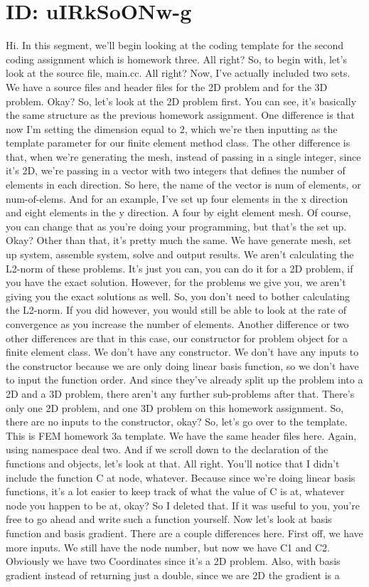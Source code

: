 \documentclass[10pt]{article}
\begin{document}
\section*{ID: uIRkSoONw-g}
Hi. In this segment, we'll begin looking at the coding template for the second coding assignment which is homework three. All right? So, to begin with, let's look at the source file, main.cc. All right? Now, I've actually included two sets. We have a source files and header files for the 2D problem and for the 3D problem. Okay? So, let's look at the 2D problem first. You can see, it's basically the same structure as the previous homework assignment. One difference is that now I'm setting the dimension equal to 2, which we're then inputting as the template parameter for our finite element method class. The other difference is that, when we're generating the mesh, instead of passing in a single integer, since it's 2D, we're passing in a vector with two integers that defines the number of elements in each direction. So here, the name of the vector is num of elements, or num-of-elems. And for an example, I've set up four elements in the x direction and eight elements in the y direction. A four by eight element mesh. Of course, you can change that as you're doing your programming, but that's the set up. Okay? Other than that, it's pretty much the same. We have generate mesh, set up system, assemble system, solve and output results. We aren't calculating the L2-norm of these problems. It's just you can, you can do it for a 2D problem, if you have the exact solution. However, for the problems we give you, we aren't giving you the exact solutions as well. So, you don't need to bother calculating the L2-norm. If you did however, you would still be able to look at the rate of convergence as you increase the number of elements. Another difference or two other differences are that in this case, our constructor for problem object for a finite element class. We don't have any constructor. We don't have any inputs to the constructor because we are only doing linear basis function, so we don't have to input the function order. And since they've already split up the problem into a 2D and a 3D problem, there aren't any further sub-problems after that. There's only one 2D problem, and one 3D problem on this homework assignment. So, there are no inputs to the constructor, okay? So, let's go over to the template. This is FEM homework 3a template. We have the same header files here. Again, using namespace deal two. And if we scroll down to the declaration of the functions and objects, let's look at that. All right. You'll notice that I didn't include the function C at node, whatever. Because since we're doing linear basis functions, it's a lot easier to keep track of what the value of C is at, whatever node you happen to be at, okay? So I deleted that. If it was useful to you, you're free to go ahead and write such a function yourself. Now let's look at basis function and basis gradient. There are a couple differences here. First off, we have more inputs. We still have the node number, but now we have C1 and C2. Obviously we have two Coordinates since it's a 2D problem. Also, with basis gradient instead of returning just a double, since we are 2D the gradient is a 
\end{document}
